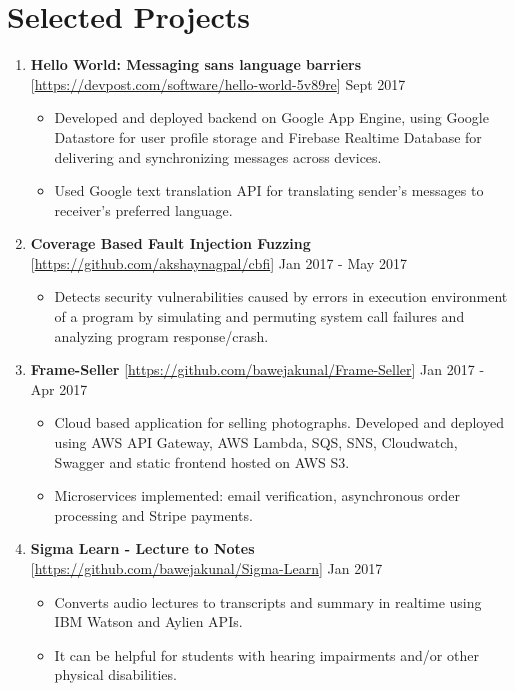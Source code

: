 \documentclass{article}
\newcommand{\bi}{\vspace{-1mm}\begin{itemize}[align=left,leftmargin=*, rightmargin=80pt, labelindent=0pt,labelsep=2pt, label={-}, nosep]}
\newcommand{\ei}{\end{itemize}}
\begin{document}
\section*{Selected Projects}
\begin{enumerate}

    \item \textbf{Hello World: Messaging sans language barriers} [\href{https://devpost.com/software/hello-world-5v89re}{https://devpost.com/software/hello-world-5v89re}] {\hfill Sept 2017}
    \bi
        \item Developed and deployed backend on Google App Engine, using Google Datastore for user profile storage and Firebase Realtime Database for delivering and synchronizing messages across devices.
        \item Used Google text translation API for translating sender's messages to receiver's preferred language.
    \ei

    \item \textbf{Coverage Based Fault Injection Fuzzing} [\href{https://github.com/akshaynagpal/cbfi}{https://github.com/akshaynagpal/cbfi}] {\hfill Jan 2017 - May 2017}
    \bi
        \item Detects security vulnerabilities caused by errors in execution environment of a program by simulating and permuting system call failures and analyzing program response/crash.
    \ei

    \item \textbf{Frame-Seller} [\href{https://github.com/bawejakunal/Frame-Seller}{https://github.com/bawejakunal/Frame-Seller}] {\hfill Jan 2017 - Apr 2017}
    \bi
        \item Cloud based application for selling photographs. Developed and deployed using AWS API Gateway, AWS Lambda, SQS, SNS, Cloudwatch, Swagger and static frontend hosted on AWS S3.

        \item Microservices implemented: email verification, asynchronous order processing and Stripe payments.
    \ei

    \item \textbf{Sigma Learn - Lecture to Notes} [\href{https://github.com/bawejakunal/Sigma-Learn}{https://github.com/bawejakunal/Sigma-Learn}] {\hfill Jan 2017}
    \bi
        \item Converts audio lectures to transcripts and summary in realtime using IBM Watson and Aylien APIs.
        
        \item It can be helpful for students with hearing impairments and/or other physical disabilities.
    \ei


\end{enumerate}
\end{document}

